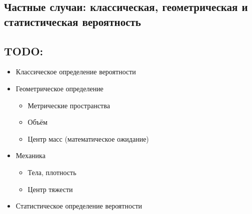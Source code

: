 \subsection{Частные случаи: классическая, геометрическая и
статистическая
вероятность}\label{ux447ux430ux441ux442ux43dux44bux435-ux441ux43bux443ux447ux430ux438-ux43aux43bux430ux441ux441ux438ux447ux435ux441ux43aux430ux44f-ux433ux435ux43eux43cux435ux442ux440ux438ux447ux435ux441ux43aux430ux44f-ux438-ux441ux442ux430ux442ux438ux441ux442ux438ux447ux435ux441ux43aux430ux44f-ux432ux435ux440ux43eux44fux442ux43dux43eux441ux442ux44c}

\subsection{TODO:}\label{todo}

\begin{itemize}

\item
  Классическое определение вероятности
\item
  Геометрическое определение

  \begin{itemize}
  
  \item
    Метрические пространства
  \item
    Объём
  \item
    Центр масс (математическое ожидание)
  \end{itemize}
\item
  Механика

  \begin{itemize}
  
  \item
    Тела, плотность
  \item
    Центр тяжести
  \end{itemize}
\item
  Статистическое определение вероятности
\end{itemize}
